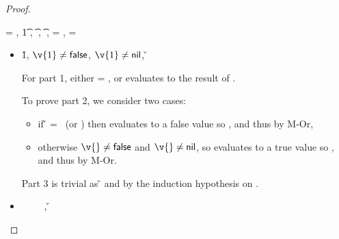 \begin{lemma}
\begin{proof}
\begin{case}[T-If] \e{} = { {} {}},
  \judgement {\propenv{}} { {\t{1}}} { {}}
                 {},
                 { {\t{}}} { {}}
                 {\object{}},
                 { {\t{}}} { {}}
                 {\object{}},
  \thenprop{\prop{}} = { {}},
  \elseprop{\prop{}} = { {}}

  \begin{itemize}
    \item[]
      \begin{subcase}[B-IfTrue]
        \opsem {\openv{}} {} {\v{1}},
              ${\v{1}} \not= {\false}$,
              ${\v{1}} \not= {\nil}$,
              \opsem {\openv{}} {} {\v{}}

              For part 1, either \object{} = \emptyobject{}, or \e{} evaluates to the
              result of .

              To prove part 2, we consider two cases:
              \begin{itemize}
                \item if \v{} = \false\ (or \nil)
                  then  evaluates to a false value so {}, and thus
                  {} by M-Or, 
                \item otherwise
                  ${\v{}} \not= {\false}$ and
                  ${\v{}} \not= {\nil}$,
                  so  evaluates to a true value so {}, and thus
                  {} by M-Or.
              \end{itemize}

              Part 3 is trivial as
              \opsem {\openv{}} {} {\v{}}
              and {\judgementtwo{}{\hastype{\v{}}{\t{}}}} by the induction hypothesis on {}.


      \end{subcase}
    \item[]
      \begin{subcase}[B-IfFalse]
        \opsem {\openv{}} {} {\false}
        \ \ \ \ 
        \opsem {\openv{}} {} {\nil},
        \opsem {\openv{}} {} {\v{}}


\end{subcase}
\end{itemize}
\end{case}
\end{proof}
\end{lemma}
